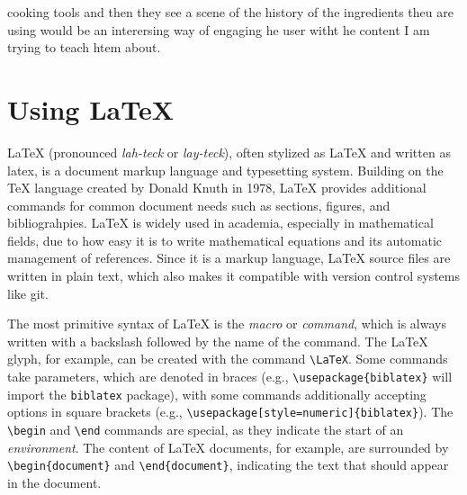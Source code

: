 \documentclass[12pt,twocolumn]{article}
\begin{document}
cooking tools and then they see a scene of the history of the ingredients theu are using would be an interersing way of engaging he user witht he content I am trying to teach htem about. 
 


\section{Using \LaTeX}

LaTeX (pronounced \textit{lah-teck} or \textit{lay-teck}), often stylized as {\LaTeX} and written as latex, is a document markup language and typesetting system.
Building on the {\TeX} language created by Donald Knuth in 1978, LaTeX provides additional commands for common document needs such as sections, figures, and bibliograhpies.
LaTeX is widely used in academia, especially in mathematical fields, due to how easy it is to write mathematical equations and its automatic management of references.
Since it is a markup language, LaTeX source files are written in plain text, which also makes it compatible with version control systems like git.

The most primitive syntax of LaTeX is the \textit{macro} or \textit{command}, which is always written with a backslash followed by the name of the command.
The {\LaTeX} glyph, for example, can be created with the command \texttt{\textbackslash LaTeX}.
Some commands take parameters, which are denoted in braces (e.g., \texttt{\textbackslash usepackage\{biblatex\}} will import the \texttt{biblatex} package), with some commands additionally accepting options in square brackets (e.g., \texttt{\textbackslash usepackage[style=numeric]\{biblatex\}}).
The \texttt{\textbackslash begin} and \texttt{\textbackslash end} commands are special, as they indicate the start of an \textit{environment}.
The content of LaTeX documents, for example, are surrounded by \texttt{\textbackslash begin\{document\}} and \texttt{\textbackslash end\{document\}}, indicating the text that should appear in the document.
\end{document}
